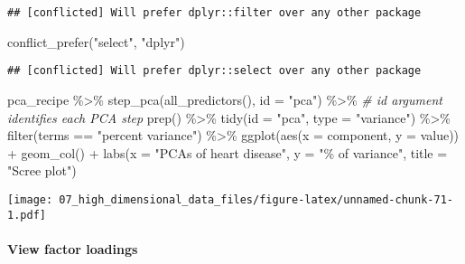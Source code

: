 \documentclass[
]{book}
\newenvironment{Shaded}{\begin{snugshade}}{\end{snugshade}}
\newcommand{\AttributeTok}[1]{\textcolor[rgb]{0.77,0.63,0.00}{#1}}
\newcommand{\CommentTok}[1]{\textcolor[rgb]{0.56,0.35,0.01}{\textit{#1}}}
\newcommand{\FunctionTok}[1]{\textcolor[rgb]{0.00,0.00,0.00}{#1}}
\newcommand{\NormalTok}[1]{#1}
\newcommand{\SpecialCharTok}[1]{\textcolor[rgb]{0.00,0.00,0.00}{#1}}
\newcommand{\StringTok}[1]{\textcolor[rgb]{0.31,0.60,0.02}{#1}}
\begin{document}
\begin{verbatim}
## [conflicted] Will prefer dplyr::filter over any other package
\end{verbatim}

\begin{Shaded}
\begin{Highlighting}[]
\FunctionTok{conflict\_prefer}\NormalTok{(}\StringTok{"select"}\NormalTok{, }\StringTok{"dplyr"}\NormalTok{) }
\end{Highlighting}
\end{Shaded}

\begin{verbatim}
## [conflicted] Will prefer dplyr::select over any other package
\end{verbatim}

\begin{Shaded}
\begin{Highlighting}[]
\NormalTok{pca\_recipe }\SpecialCharTok{\%\textgreater{}\%}
  \FunctionTok{step\_pca}\NormalTok{(}\FunctionTok{all\_predictors}\NormalTok{(), }
           \AttributeTok{id =} \StringTok{"pca"}\NormalTok{) }\SpecialCharTok{\%\textgreater{}\%} \CommentTok{\# id argument identifies each PCA step }
  \FunctionTok{prep}\NormalTok{() }\SpecialCharTok{\%\textgreater{}\%}
  \FunctionTok{tidy}\NormalTok{(}\AttributeTok{id =} \StringTok{"pca"}\NormalTok{, }\AttributeTok{type =} \StringTok{"variance"}\NormalTok{) }\SpecialCharTok{\%\textgreater{}\%}
  \FunctionTok{filter}\NormalTok{(terms }\SpecialCharTok{==} \StringTok{"percent variance"}\NormalTok{) }\SpecialCharTok{\%\textgreater{}\%} 
  \FunctionTok{ggplot}\NormalTok{(}\FunctionTok{aes}\NormalTok{(}\AttributeTok{x =}\NormalTok{ component, }\AttributeTok{y =}\NormalTok{ value)) }\SpecialCharTok{+}
    \FunctionTok{geom\_col}\NormalTok{() }\SpecialCharTok{+}
    \FunctionTok{labs}\NormalTok{(}\AttributeTok{x =} \StringTok{"PCAs of heart disease"}\NormalTok{,}
         \AttributeTok{y =} \StringTok{"\% of variance"}\NormalTok{,}
         \AttributeTok{title =} \StringTok{"Scree plot"}\NormalTok{)}
\end{Highlighting}
\end{Shaded}

\texttt{[image: 07\_high\_dimensional\_data\_files/figure-latex/unnamed-chunk-71-1.pdf]}

\hypertarget{view-factor-loadings}{%
\paragraph{View factor loadings}\label{view-factor-loadings}}
\end{document}
